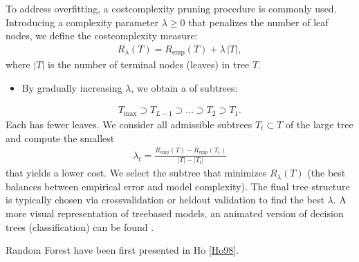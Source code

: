 \documentclass[letterpaper,10pt,english]{jupyterBook}
\begin{document}
\sphinxAtStartPar
To address overfitting, a cost\sphinxhyphen{}complexity pruning procedure is commonly used. Introducing a complexity parameter \(\lambda \ge 0\) that penalizes the number of leaf nodes, we define the cost\sphinxhyphen{}complexity measure:
\begin{equation*}
\begin{split}
R_{\lambda}(T) = R_{\mathrm{emp}}(T) + \lambda \, |T|,
\end{split}
\end{equation*}
\sphinxAtStartPar
where \(|T|\) is the number of terminal nodes (leaves) in tree \(T\).
\begin{itemize}
\item {} 
\sphinxAtStartPar
By gradually increasing \(\lambda\), we obtain a  of subtrees:

\end{itemize}
\begin{equation*}
\begin{split}
T_{\max} \supset T_{L-1} \supset \dots \supset T_2 \supset T_1.
\end{split}
\end{equation*}
\sphinxAtStartPar
Each has fewer leaves. We consider all admissible subtrees \(T_t \subset T\) of the large tree and compute the smallest
\begin{equation*}
\begin{split}
\lambda_t = \frac{R_{\mathrm{emp}}(T) - R_{\mathrm{emp}}(T_t)}{|T| - |T_t|}
\end{split}
\end{equation*}
\sphinxAtStartPar
that yields a lower cost. We select the subtree that minimizes \(R_{\lambda}(T)\) (the best balances between empirical error and model complexity).
The final tree structure is typically chosen via cross\sphinxhyphen{}validation or held\sphinxhyphen{}out validation to find the best \(\lambda\).
A more visual representation of tree\sphinxhyphen{}based models, an animated version of decision trees (classification) can be found .

\begin{sphinxShadowBox}
\sphinxstylesidebartitle{}

\sphinxAtStartPar
Random Forest have been first presented in Ho {[}\hyperlink{cite.bibliography:id3}{Ho98}{]}.
\end{sphinxShadowBox}
\end{document}
